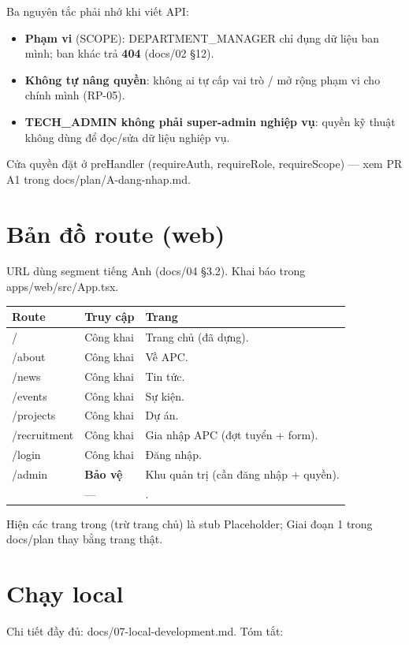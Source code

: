 \documentclass[11pt]{article}
\newcommand{\code}[1]{{\ttfamily #1}}
\begin{document}
\medskip
\noindent Ba nguyên tắc phải nhớ khi viết API:
\begin{itemize}
  \item \textbf{Phạm vi} (\code{SCOPE}): \code{DEPARTMENT\_MANAGER} chỉ đụng dữ liệu ban mình; ban khác trả \textbf{404} (\code{docs/02} §12).
  \item \textbf{Không tự nâng quyền}: không ai tự cấp vai trò / mở rộng phạm vi cho chính mình (RP-05).
  \item \textbf{TECH\_ADMIN không phải super-admin nghiệp vụ}: quyền kỹ thuật không dùng để đọc/sửa dữ liệu nghiệp vụ.
\end{itemize}
\noindent Cửa quyền đặt ở \code{preHandler} (\code{requireAuth}, \code{requireRole}, \code{requireScope}) — xem PR A1 trong \code{docs/plan/A-dang-nhap.md}.

\section{Bản đồ route (web)}\label{sec:routes}
URL dùng segment tiếng Anh (\code{docs/04} §3.2). Khai báo trong \code{apps/web/src/App.tsx}.

\noindent\begin{tabularx}{\textwidth}{@{}l l >{\raggedright\arraybackslash}X@{}}
\toprule
\textbf{Route} & \textbf{Truy cập} & \textbf{Trang} \\ \midrule
\code{/} & Công khai & Trang chủ (đã dựng). \\
\code{/about} & Công khai & Về APC. \\
\code{/news} & Công khai & Tin tức. \\
\code{/events} & Công khai & Sự kiện. \\
\code{/projects} & Công khai & Dự án. \\
\code{/recruitment} & Công khai & Gia nhập APC (đợt tuyển + form). \\
\code{/login} & Công khai & Đăng nhập. \\
\code{/admin} & \textbf{Bảo vệ} & Khu quản trị (cần đăng nhập + quyền). \\
\code{*} & — & 404. \\ \bottomrule
\end{tabularx}

\medskip
\noindent Hiện các trang trong (trừ trang chủ) là stub \code{Placeholder}; Giai đoạn 1 trong \code{docs/plan} thay bằng trang thật.

\section{Chạy local}\label{sec:run}
Chi tiết đầy đủ: \code{docs/07-local-development.md}. Tóm tắt:
\end{document}
